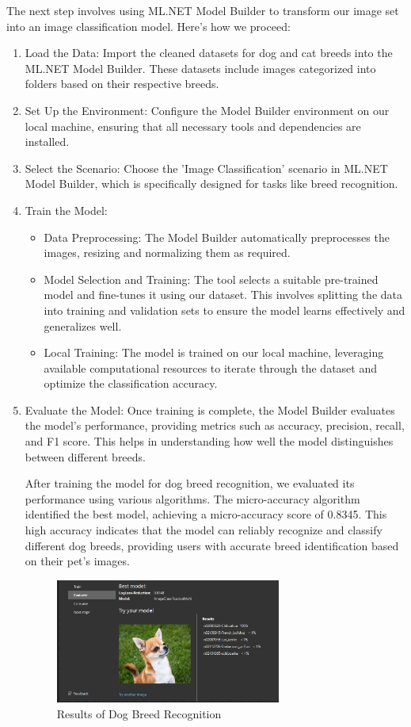 The next step involves using ML.NET Model Builder to transform our image set into an image classification model. Here's how we proceed:
\begin{enumerate}
    \item Load the Data: Import the cleaned datasets for dog and cat breeds into the ML.NET Model Builder. These datasets include images 
    categorized into folders based on their respective breeds.
    \item Set Up the Environment: Configure the Model Builder environment on our local machine, ensuring that all necessary tools and dependencies are installed.
    \item Select the Scenario: Choose the 'Image Classification' scenario in ML.NET Model Builder, which is specifically designed for tasks like breed recognition.
    \item Train the Model:
    \begin{itemize}
        \item Data Preprocessing: The Model Builder automatically preprocesses the images, resizing and normalizing them as required.
        \item Model Selection and Training: The tool selects a suitable pre-trained model and fine-tunes it using our dataset. This involves 
        splitting the data into training and validation sets to ensure the model learns effectively and generalizes well.
        \item Local Training: The model is trained on our local machine, leveraging available computational resources to iterate through 
        the dataset and optimize the classification accuracy.
    \end{itemize}
    \item Evaluate the Model: Once training is complete, the Model Builder evaluates the model's performance, 
    providing metrics such as accuracy, precision, recall, and F1 score. This helps in understanding how well 
    the model distinguishes between different breeds.

    After training the model for dog breed recognition, we evaluated its performance using various algorithms. 
    The micro-accuracy algorithm identified the best model, achieving a micro-accuracy score of 0.8345. This 
    high accuracy indicates that the model can reliably recognize and classify different dog breeds, providing 
    users with accurate breed identification based on their pet's images.

    \begin{figure}[H]
        \centering
        \includegraphics[width=0.7\textwidth]{Figures/AI/ai_result.png}
        \caption{Results of Dog Breed Recognition}
    \end{figure}


\end{enumerate}
